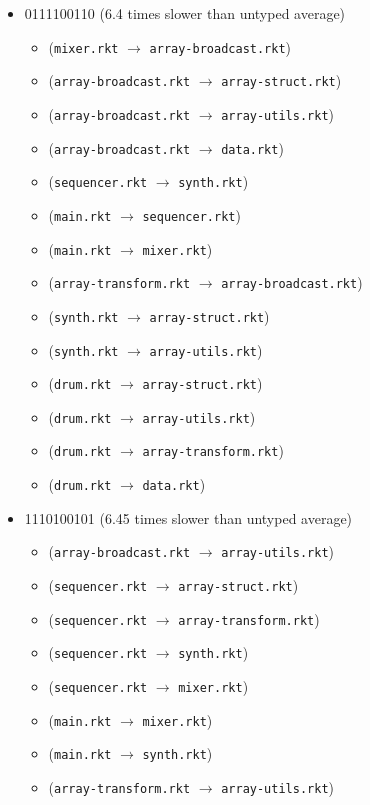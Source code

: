 \documentclass{article}
\newcommand{\mono}[1]{\texttt{#1}}
\begin{document}
\begin{itemize}
\item 0111100110 (6.4 times slower than untyped average)
  \begin{itemize}
  \item (\mono{mixer.rkt} $\rightarrow$ \mono{array-broadcast.rkt})
  \item (\mono{array-broadcast.rkt} $\rightarrow$ \mono{array-struct.rkt})
  \item (\mono{array-broadcast.rkt} $\rightarrow$ \mono{array-utils.rkt})
  \item (\mono{array-broadcast.rkt} $\rightarrow$ \mono{data.rkt})
  \item (\mono{sequencer.rkt} $\rightarrow$ \mono{synth.rkt})
  \item (\mono{main.rkt} $\rightarrow$ \mono{sequencer.rkt})
  \item (\mono{main.rkt} $\rightarrow$ \mono{mixer.rkt})
  \item (\mono{array-transform.rkt} $\rightarrow$ \mono{array-broadcast.rkt})
  \item (\mono{synth.rkt} $\rightarrow$ \mono{array-struct.rkt})
  \item (\mono{synth.rkt} $\rightarrow$ \mono{array-utils.rkt})
  \item (\mono{drum.rkt} $\rightarrow$ \mono{array-struct.rkt})
  \item (\mono{drum.rkt} $\rightarrow$ \mono{array-utils.rkt})
  \item (\mono{drum.rkt} $\rightarrow$ \mono{array-transform.rkt})
  \item (\mono{drum.rkt} $\rightarrow$ \mono{data.rkt})
  \end{itemize}
\item 1110100101 (6.45 times slower than untyped average)
  \begin{itemize}
  \item (\mono{array-broadcast.rkt} $\rightarrow$ \mono{array-utils.rkt})
  \item (\mono{sequencer.rkt} $\rightarrow$ \mono{array-struct.rkt})
  \item (\mono{sequencer.rkt} $\rightarrow$ \mono{array-transform.rkt})
  \item (\mono{sequencer.rkt} $\rightarrow$ \mono{synth.rkt})
  \item (\mono{sequencer.rkt} $\rightarrow$ \mono{mixer.rkt})
  \item (\mono{main.rkt} $\rightarrow$ \mono{mixer.rkt})
  \item (\mono{main.rkt} $\rightarrow$ \mono{synth.rkt})
  \item (\mono{array-transform.rkt} $\rightarrow$ \mono{array-utils.rkt})

\end{itemize}
\end{itemize}
\end{document}
